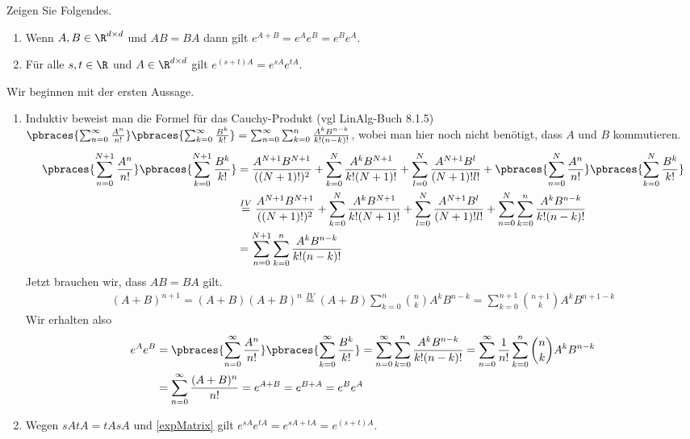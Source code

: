 \begin{exercise}
    Zeigen Sie Folgendes.
    \begin{enumerate}[label = \alph*)]
        \item Wenn $A, B \in \R^{d \times d}$  und $AB = BA$ dann gilt $e^{A + B} = e^A e^B = e^B e^A $.
        \item Für alle $s, t \in \R$ und $A \in \R^{d \times d}$ gilt $e^{(s + t)A} = e^{sA} e^{tA}$.
    \end{enumerate}
\end{exercise}

\begin{solution}
    Wir beginnen mit der ersten Aussage.
    \begin{enumerate}[label = \alph*)]
        \item \label{expMatrix} Induktiv beweist man die Formel für das Cauchy-Produkt (vgl LinAlg-Buch 8.1.5) $\pbraces{\sum_{n = 0}^\infty \frac{A^n}{n!}} \pbraces{\sum_{k = 0}^\infty \frac{B^k}{k!}} = \sum_{n = 0}^\infty \sum_{k = 0}^n \frac{A^k B^{n - k}}{k! (n - k)!}$, wobei man hier noch nicht benötigt, dass $A$ und $B$ kommutieren. 
        \begin{align*}
            \pbraces{\sum_{n = 0}^{N + 1} \frac{A^n}{n!}} \pbraces{\sum_{k = 0}^{N + 1} \frac{B^k}{k!}} &= \frac{A^{N + 1} B^{N +1}}{((N + 1)!)^2}  + \sum_{k = 0}^N \frac{A^k B^{N + 1}}{k!(N + 1)!} + \sum_{l = 0}^N \frac{A^{N + 1} B^l}{(N + 1)! l!} +  \pbraces{\sum_{n = 0}^N \frac{A^n}{n!}} \pbraces{\sum_{k = 0}^N \frac{B^k}{k!}} \\ 
            &\stackrel{IV}{=} \frac{A^{N + 1} B^{N +1}}{((N + 1)!)^2}  + \sum_{k = 0}^N \frac{A^k B^{N + 1}}{k!(N + 1)!} + \sum_{l = 0}^N \frac{A^{N + 1} B^l}{(N + 1)! l!} + \sum_{n = 0}^N \sum_{k = 0}^n \frac{A^k B^{n - k}}{k! (n - k)!} \\
            &= \sum_{n = 0}^{N + 1} \sum_{k = 0}^n \frac{A^k B^{n - k}}{k! (n - k)!} 
        \end{align*}
        Jetzt brauchen wir, dass $AB = BA$ gilt. 
        \begin{align*}
            (A + B)^{n + 1} = (A + B)(A + B)^n \stackrel{IV}{=} (A + B) \sum_{k = 0}^n {n \choose k} A^k B^{n - k} = \sum_{k = 0}^{n + 1} {n + 1 \choose k} A^k B^{n + 1 - k}
        \end{align*}
        Wir erhalten also
        \begin{align*}
            e^A e^B &= \pbraces{\sum_{n = 0}^\infty \frac{A^n}{n!}} \pbraces{\sum_{k = 0}^\infty \frac{B^k}{k!}} = \sum_{n = 0}^\infty \sum_{k = 0}^n \frac{A^k B^{n - k}}{k! (n - k)!} = \sum_{n = 0}^\infty \frac{1}{n!} \sum_{k = 0}^n {n \choose k} A^{k}B^{n - k} \\
            &=  \sum_{n = 0}^\infty \frac{(A + B)^n}{n!} = e^{A + B} = e^{B + A} = e^B e^A
        \end{align*}
        \item Wegen $sAtA = tAsA$ und \ref{expMatrix} gilt $e^{sA}e^{tA} = e^{sA + tA} = e^{(s + t) A}$. 
    \end{enumerate}
\end{solution}
